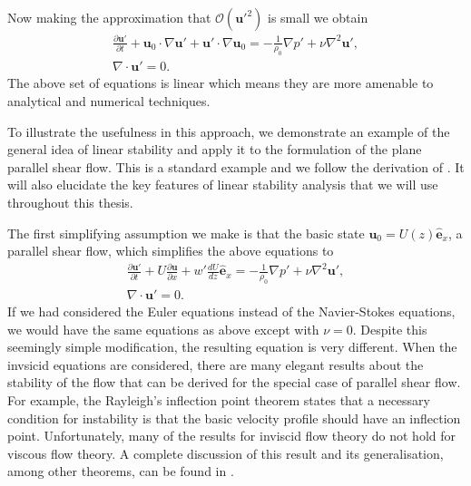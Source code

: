 Now making the approximation that $\mathcal{O}(\bm{u}'^{2})$ is small we obtain
\begin{align}
\frac{\partial \bm{u}'}{\partial t} + \bm{u}_{0}\cdot\nabla \bm{u}' + \bm{u}'\cdot\nabla\bm{u}_{0} =  -\frac{1}{\rho_{0}}\nabla p' + \nu\nabla^{2}\bm{u}',\\
 \nabla \cdot \bm{u}'=0.
\end{align}
The above set of equations is linear which means they are more amenable to analytical and numerical techniques. 

To illustrate the usefulness in this approach, we demonstrate an example of the general idea of linear stability and apply it to the formulation of the plane parallel shear flow. This is a standard example and we follow the derivation of \cite{drazinreid}. It will also elucidate the key features of linear stability analysis that we will use throughout this thesis.

The first simplifying assumption we make is that the basic state $\bm{u}_{0}=U(z)\hat{\bm{e}}_{x}$, a parallel shear flow, which simplifies the above equations to
\begin{align}
\frac{\partial \bm{u}'}{\partial t} + U\frac{\partial \bm{u}}{\partial x} + w'\frac{dU}{dz}\hat{\bm{e}}_{x}= -\frac{1}{\rho_{0}}\nabla p' + \nu\nabla^{2} \bm{u}',\\
\nabla \cdot\bm{u}'=0.
\end{align}
If we had considered the Euler equations instead of the Navier-Stokes equations, we would have the same equations as above except with $\nu=0$. Despite this seemingly simple modification, the resulting equation is very different. When the invsicid equations are considered, there are many elegant results about the stability of the flow that can be derived for the special case of parallel shear flow. For example, the Rayleigh's inflection point theorem states that a necessary condition for instability is that the basic velocity profile should have an inflection point\cite{drazinreid}. Unfortunately, many of the results for inviscid flow theory do not hold for viscous flow theory. A complete discussion of this result and its generalisation, among other theorems, can be found in \cite{drazinreid,kundu}.

